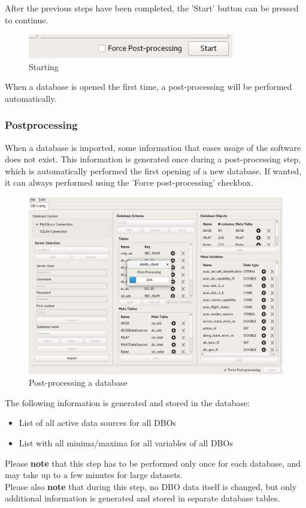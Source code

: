 After the previous steps have been completed, the 'Start' button can be pressed to continue. \\

\begin{figure}[H]
  \center
    \includegraphics[width=9cm,frame]{../screenshots/start.png}
  \caption{Starting}
\end{figure}

When a database is opened the first time, a post-processing will be performed automatically.

\subsubsection{Postprocessing}
When a database is imported, some information that eases usage of the software does not exist. This information is generated once during a post-processing step, which is automatically performed the first opening of a new database. If wanted, it can always performed using the 'Force post-processing' checkbox.

\begin{figure}[H]
  \hspace*{-2cm}
    \includegraphics[width=18cm,frame]{../screenshots/db_postprocessing.png}
  \caption{Post-processing a database}
  \label{fig:db_postprocessing}
\end{figure}

The following information is generated and stored in the database:

\begin{itemize}  
\item List of all active data sources for all DBOs
\item List with all minima/maxima for all variables of all DBOs
\end{itemize}

Please \textbf{note} that this step has to be performed only once for each database, and may take up to a few minutes for large datasets. \\

Please also \textbf{note} that during this step, no DBO data itself is changed, but only additional information is generated and stored in separate database tables.
 
